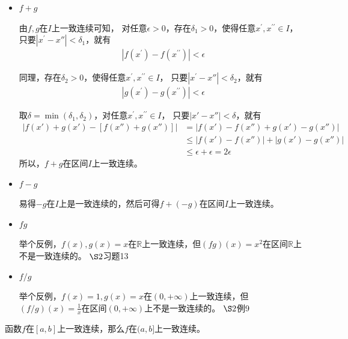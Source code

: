 \documentclass{article}
\begin{document}
\begin{itemize}
  \item $f + g$

        由$f, g$在$I$上一致连续可知，
        对任意$\epsilon > 0$，存在$\delta_1 > 0$，使得任意$x^\prime, x^{\prime\prime} \in I$，
        只要$|x^\prime - x''| < \delta_1$，就有
        \begin{align*}
          |f(x^\prime) - f(x^{\prime\prime})| < \epsilon
        \end{align*}

        同理，存在$\delta_2 > 0$，使得任意$x^\prime, x^{\prime\prime} \in I$，
        只要$|x^\prime - x''| < \delta_2$，就有
        \begin{align*}
          |g(x^\prime) - g(x^{\prime\prime})| < \epsilon
        \end{align*}

        取$\delta = \min(\delta_1, \delta_2)$，对任意$x^\prime, x^{\prime\prime} \in I$，
        只要$|x' - x''| < \delta$，就有
        \begin{align*}
          |f(x') + g(x') - [f(x'') + g(x'')]|
           & = |f(x') - f(x'') + g(x') - g(x'')|      \\
           & \leq |f(x') - f(x'')| + |g(x') - g(x'')| \\
           & \leq \epsilon + \epsilon = 2\epsilon
        \end{align*}
        所以，$f + g$在区间$I$上一致连续。

  \item $f - g$

        易得$-g$在$I$上是一致连续的，然后可得$f + (-g)$在区间$I$上一致连续。

  \item $fg$

        举个反例，$f(x), g(x) = x$在$\mathbb{R}$上一致连续，但$(fg)(x) = x^2$在区间$\mathbb{R}$上不是一致连续的。
        $\S 2$习题13

  \item $f/g$

        举个反例，$f(x) = 1, g(x) = x$在$(0, +\infty)$上一致连续，但$(f/g)(x) = \frac{1}{x}$在区间$(0, +\infty)$上不是一致连续的。
        $\S 2$例9

\end{itemize}

\begin{zremark}
  函数$f$在$[a, b]$上一致连续，那么$f$在$(a, b]$上一致连续。
\end{zremark}
\end{document}
